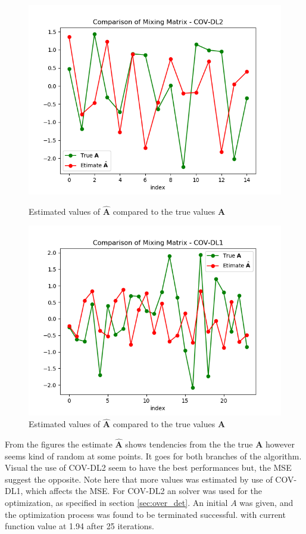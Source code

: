 \begin{figure}[H]
    \begin{minipage}[t]{.45\textwidth}
    	\centering
		\includegraphics[scale=0.5]{figures/ch_6/COV2_simple.png}
		\caption{Estimated values of $\hat{\textbf{A}}$ compared to the true 					values $\textbf{A}$}
		\label{fig:cov2_simple}
    \end{minipage} 
    \hfill
    \begin{minipage}[t]{.45\textwidth}
        \centering
		\includegraphics[scale=0.5]{figures/ch_6/COV1_simple.png}
		\caption{Estimated values of $\hat{\textbf{A}}$ compared to the true 				values $\textbf{A}$}
		\label{fig:cov1_simple}
    \end{minipage}
\end{figure}
From the figures the estimate $\hat{\textbf{A}}$ shows tendencies from the the true $\textbf{A}$ however seems kind of random at some points. It goes for both branches of the algorithm. Visual the use of COV-DL2 seem to have the best performances but, the MSE suggest the opposite. Note here that more values was estimated by use of COV-DL1, which affects the MSE.
For COV-DL2 an solver was used for the optimization, as specified in section \ref{sec:over_det}. An initial $A$ was given, and the optimization process was found to be terminated successful. with current function value at 1.94 after 25 iterations. 

